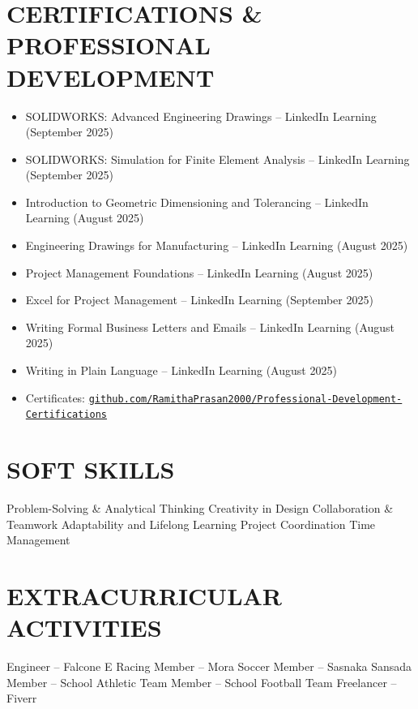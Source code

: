 \documentclass[10pt,a4paper]{article}
\begin{document}
\section{CERTIFICATIONS \& PROFESSIONAL DEVELOPMENT}
\vspace{-2pt}
\begin{itemize}[leftmargin=18pt, itemsep=3pt, topsep=0pt, partopsep=0pt, parsep=0pt]
    \item SOLIDWORKS: Advanced Engineering Drawings -- LinkedIn Learning (September 2025)
    \item SOLIDWORKS: Simulation for Finite Element Analysis -- LinkedIn Learning (September 2025)
    \item Introduction to Geometric Dimensioning and Tolerancing -- LinkedIn Learning (August 2025)
    \item Engineering Drawings for Manufacturing -- LinkedIn Learning (August 2025)
    \item Project Management Foundations -- LinkedIn Learning (August 2025)
    \item Excel for Project Management -- LinkedIn Learning (September 2025)
    \item Writing Formal Business Letters and Emails -- LinkedIn Learning (August 2025)
    \item Writing in Plain Language -- LinkedIn Learning (August 2025)
    \item Certificates: \href{https://github.com/RamithaPrasan2000/Professional-Development-Certifications}{\nolinkurl{github.com/RamithaPrasan2000/Professional-Development-Certifications}}
\end{itemize}
\vspace{7pt}

\section{SOFT SKILLS}
Problem-Solving \& Analytical Thinking \;\textbullet\; Creativity in Design \;\textbullet\; Collaboration \& Teamwork \;\textbullet\; Adaptability and Lifelong Learning \;\textbullet\; Project Coordination \;\textbullet\; Time Management

\section{EXTRACURRICULAR ACTIVITIES}
Engineer -- Falcone E Racing \;\textbullet\; Member -- Mora Soccer \;\textbullet\; Member -- Sasnaka Sansada \;\textbullet\; Member -- School Athletic Team \;\textbullet\; Member -- School Football Team \;\textbullet\; Freelancer -- Fiverr
\end{document}
